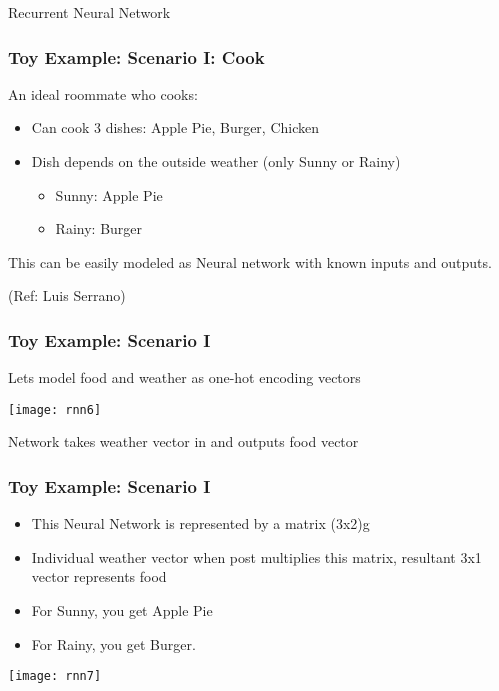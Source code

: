 \begin{frame}
  \begin{center}
    {\Large Recurrent Neural Network}
  \end{center}
\end{frame}

\begin{frame}[fragile] \frametitle{Toy Example: Scenario I: Cook}
An ideal roommate who cooks:
\begin{itemize}
\item Can cook 3 dishes: Apple Pie, Burger, Chicken
\item Dish depends on the outside weather (only Sunny or Rainy)
\begin{itemize}
\item Sunny: Apple Pie
\item Rainy: Burger
\end{itemize}
\end{itemize}
This can be easily modeled as Neural network with known inputs and outputs.

{\tiny (Ref: Luis Serrano)}

\end{frame}

\begin{frame}[fragile] \frametitle{Toy Example: Scenario I}
Lets model food and weather as one-hot encoding vectors
\begin{center}
\texttt{[image: rnn6]}
\end{center}
Network takes weather vector in and outputs food vector
\end{frame}

\begin{frame}[fragile] \frametitle{Toy Example: Scenario I}
\begin{itemize}
\item This Neural Network is represented by a matrix (3x2)g
\item Individual weather vector when post multiplies this matrix, resultant 3x1 vector represents food
\item For Sunny, you get Apple Pie
\item For Rainy, you get Burger.
\end{itemize}
\begin{center}
\texttt{[image: rnn7]}
\end{center}
\end{frame}


